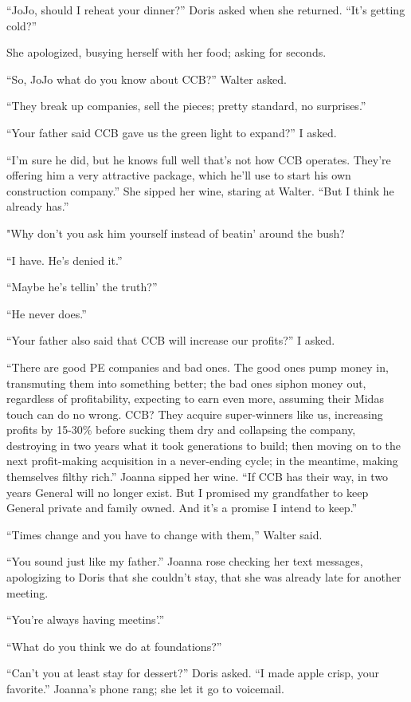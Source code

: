 ``JoJo, should I reheat your dinner?'' Doris asked when she returned.
``It's getting cold?''

She apologized, busying herself with her food; asking for seconds.

``So, JoJo what do you know about CCB?'' Walter asked.

``They break up companies, sell the pieces; pretty standard, no
surprises.''

``Your father said CCB gave us the green light to expand?'' I asked.

``I'm sure he did, but he knows full well that's not how CCB operates.
They're offering him a very attractive package, which he'll use to start
his own construction company.'' She sipped her wine, staring at Walter.
``But I think he already has.''

"Why don't you ask him yourself instead of beatin' around the bush?

``I have. He's denied it.''

``Maybe he's tellin' the truth?''

``He never does.''

``Your father also said that CCB will increase our profits?'' I asked.

``There are good PE companies and bad ones. The good ones pump money in,
transmuting them into something better; the bad ones siphon money out,
regardless of profitability, expecting to earn even more, assuming their
Midas touch can do no wrong. CCB? They acquire super-winners like us,
increasing profits by 15-30\% before sucking them dry and collapsing the
company, destroying in two years what it took generations to build; then
moving on to the next profit-making acquisition in a never-ending cycle;
in the meantime, making themselves filthy rich.'' Joanna sipped her
wine. ``If CCB has their way, in two years General will no longer exist.
But I promised my grandfather to keep General private and family owned.
And it's a promise I intend to keep.''

``Times change and you have to change with them,'' Walter said.

``You sound just like my father.'' Joanna rose checking her text
messages, apologizing to Doris that she couldn't stay, that she was
already late for another meeting.

``You're always having meetins'.''

``What do you think we do at foundations?''

``Can't you at least stay for dessert?'' Doris asked. ``I made apple
crisp, your favorite.'' Joanna's phone rang; she let it go to voicemail.

